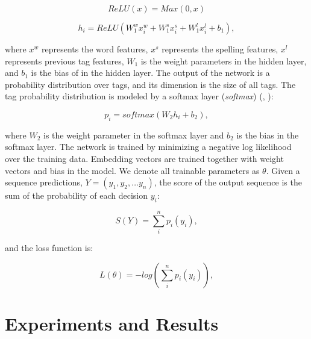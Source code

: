 \begin{equation}
\textit{ReLU}\left(x\right) = \textit{Max}\left(0,x\right)
\end{equation}

\begin{equation}
h_{i}=\textit{ReLU}\left( W_{1}^{w}x_{i}^{w}+W_{1}^{s}x_{i}^{s}+W_{1}^{l}x_{i}^{l}+b_{1}\right),
\end{equation}

\noindent
where $x^{w}$ represents the word features, $x^{s}$ represents the spelling features, $x^{l}$ represents previous tag features, $W_{1}$ is the weight parameters in the hidden layer, and $b_{1}$ is the bias of in the hidden layer. The output of the network is a probability distribution over tags, and its dimension is the size of all tags. The tag probability distribution is modeled by a softmax layer (\textit{softmax}) (\citeauthor{dugas2001incorporating}, \citeyear{dugas2001incorporating}):

\begin{equation}
p_{i}=\textit{softmax}\left(W_{2}h_{i}+b_{2}\right),
\end{equation}

\noindent
where $W_{2}$ is the weight parameter in the softmax layer and $b_{2}$ is the bias in the softmax layer. The network is trained by minimizing a negative log likelihood over the training data. Embedding vectors are trained together with weight vectors and bias in the model. We denote all trainable parameters as $\theta$. Given a sequence predictions, $Y=\left( y_{1},y_{2},\ldots y_{n}\right)$,
the score of the output sequence is the sum of the probability of each decision $y_{i}$: 

\begin{equation}
S\left( Y\right) = \sum _{i}^{n}p_{i}\left(y_{i}\right),
\end{equation}

\noindent
and the loss function is:

\begin{equation}
L\left(\theta\right) = -log\left(\sum _{i}^{n}p_{i}\left(y_{i}\right)\right),
\end{equation}

\section{Experiments and Results}

